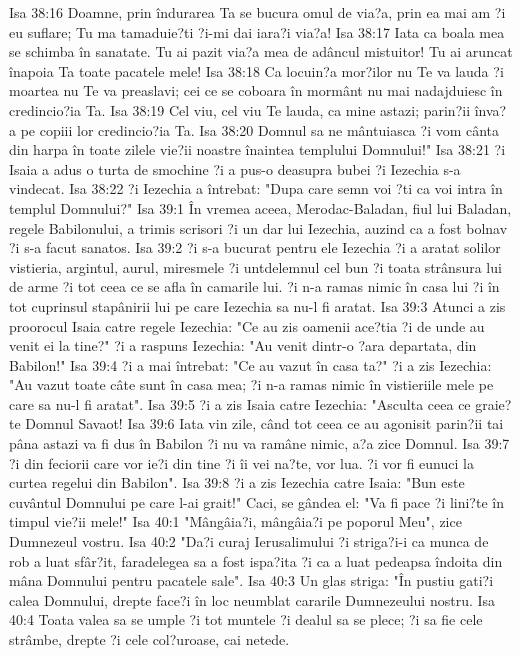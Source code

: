 Isa 38:16  Doamne, prin îndurarea Ta se bucura omul de via?a, prin ea mai am ?i eu suflare; Tu ma tamaduie?ti ?i-mi dai iara?i via?a!
Isa 38:17  Iata ca boala mea se schimba în sanatate. Tu ai pazit via?a mea de adâncul mistuitor! Tu ai aruncat înapoia Ta toate pacatele mele!
Isa 38:18  Ca locuin?a mor?ilor nu Te va lauda ?i moartea nu Te va preaslavi; cei ce se coboara în mormânt nu mai nadajduiesc în credincio?ia Ta.
Isa 38:19  Cel viu, cel viu Te lauda, ca mine astazi; parin?ii înva?a pe copiii lor credincio?ia Ta.
Isa 38:20  Domnul sa ne mântuiasca ?i vom cânta din harpa în toate zilele vie?ii noastre înaintea templului Domnului!"
Isa 38:21  ?i Isaia a adus o turta de smochine ?i a pus-o deasupra bubei ?i Iezechia s-a vindecat.
Isa 38:22  ?i Iezechia a întrebat: "Dupa care semn voi ?ti ca voi intra în templul Domnului?"
Isa 39:1  În vremea aceea, Merodac-Baladan, fiul lui Baladan, regele Babilonului, a trimis scrisori ?i un dar lui Iezechia, auzind ca a fost bolnav ?i s-a facut sanatos.
Isa 39:2  ?i s-a bucurat pentru ele Iezechia ?i a aratat solilor vistieria, argintul, aurul, miresmele ?i untdelemnul cel bun ?i toata strânsura lui de arme ?i tot ceea ce se afla în camarile lui. ?i n-a ramas nimic în casa lui ?i în tot cuprinsul stapânirii lui pe care Iezechia sa nu-l fi aratat.
Isa 39:3  Atunci a zis proorocul Isaia catre regele Iezechia: "Ce au zis oamenii ace?tia ?i de unde au venit ei la tine?" ?i a raspuns Iezechia: "Au venit dintr-o ?ara departata, din Babilon!"
Isa 39:4  ?i a mai întrebat: "Ce au vazut în casa ta?" ?i a zis Iezechia: "Au vazut toate câte sunt în casa mea; ?i n-a ramas nimic în vistieriile mele pe care sa nu-l fi aratat".
Isa 39:5  ?i a zis Isaia catre Iezechia: "Asculta ceea ce graie?te Domnul Savaot!
Isa 39:6  Iata vin zile, când tot ceea ce au agonisit parin?ii tai pâna astazi va fi dus în Babilon ?i nu va ramâne nimic, a?a zice Domnul.
Isa 39:7  ?i din feciorii care vor ie?i din tine ?i îi vei na?te, vor lua. ?i vor fi eunuci la curtea regelui din Babilon".
Isa 39:8  ?i a zis Iezechia catre Isaia: "Bun este cuvântul Domnului pe care l-ai grait!" Caci, se gândea el: "Va fi pace ?i lini?te în timpul vie?ii mele!"
Isa 40:1  "Mângâia?i, mângâia?i pe poporul Meu", zice Dumnezeul vostru.
Isa 40:2  "Da?i curaj Ierusalimului ?i striga?i-i ca munca de rob a luat sfâr?it, faradelegea sa a fost ispa?ita ?i ca a luat pedeapsa îndoita din mâna Domnului pentru pacatele sale".
Isa 40:3  Un glas striga: "În pustiu gati?i calea Domnului, drepte face?i în loc neumblat cararile Dumnezeului nostru.
Isa 40:4  Toata valea sa se umple ?i tot muntele ?i dealul sa se plece; ?i sa fie cele strâmbe, drepte ?i cele col?uroase, cai netede.
